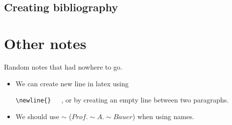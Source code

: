 \documentclass{article}
\newcommand{\command}[1]{
    \commandTwo{#1}{}\
}
\newcommand{\commandTwo}[2]{
    \texttt{\textbackslash{}#1\{#2\}}\
}
\begin{document}
\subsection{Creating bibliography}

\section{Other notes}

Random notes that had nowhere to go.

\begin{itemize}
   \item We can create new line in latex using \command{newline}\ , or by creating an empty line between two paragraphs.
   \item We should use $\sim{}$ (\emph{$Prof. \sim{}A.\sim{}Bauer$}) when using names.
\end{itemize}
\end{document}
